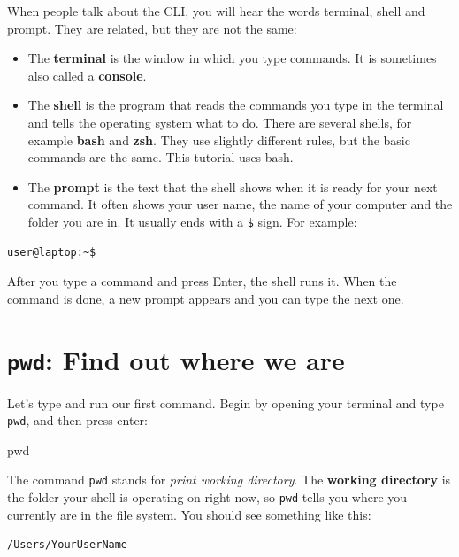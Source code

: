\documentclass[
  letterpaper,
  DIV=11,
  numbers=noendperiod]{scrreprt}
\newenvironment{Shaded}{}{}
\newcommand{\BuiltInTok}[1]{\textcolor[rgb]{0.84,0.23,0.29}{#1}}
\providecommand{\tightlist}{%
  \setlength{\itemsep}{0pt}\setlength{\parskip}{0pt}}
\begin{document}
When people talk about the CLI, you will hear the words terminal, shell
and prompt. They are related, but they are not the same:

\begin{itemize}
\tightlist
\item
  The \textbf{terminal} is the window in which you type commands. It is
  sometimes also called a \textbf{console}.
\item
  The \textbf{shell} is the program that reads the commands you type in
  the terminal and tells the operating system what to do. There are
  several shells, for example \textbf{bash} and \textbf{zsh}. They use
  slightly different rules, but the basic commands are the same. This
  tutorial uses bash.
\item
  The \textbf{prompt} is the text that the shell shows when it is ready
  for your next command. It often shows your user name, the name of your
  computer and the folder you are in. It usually ends with a \texttt{\$}
  sign. For example:
\end{itemize}

\begin{verbatim}
user@laptop:~$
\end{verbatim}

After you type a command and press Enter, the shell runs it. When the
command is done, a new prompt appears and you can type the next one.

\section{\texorpdfstring{\texttt{pwd}: Find out where we
are}{pwd: Find out where we are}}\label{pwd-find-out-where-we-are}

Let's type and run our first command. Begin by opening your terminal and
type \texttt{pwd}, and then press enter:

\begin{Shaded}
\begin{Highlighting}[]
\BuiltInTok{pwd}
\end{Highlighting}
\end{Shaded}

The command \texttt{pwd} stands for \emph{print working directory}. The
\textbf{working directory} is the folder your shell is operating on
right now, so \texttt{pwd} tells you where you currently are in the file
system. You should see something like this:

\begin{verbatim}
/Users/YourUserName
\end{verbatim}
\end{document}
